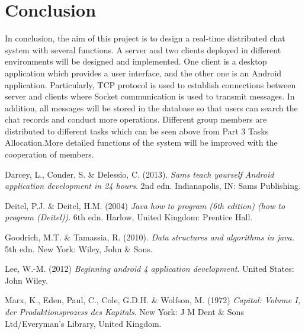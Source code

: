 \documentclass{article}
\begin{document}
\section{Conclusion}

In conclusion, the aim of this project is to design a real-time distributed chat system with several functions. A server and two clients deployed in different environments will be designed and implemented. One client is a desktop application which provides a user interface, and the other one is an Android application. Particularly, TCP protocol is used to establish connections between server and clients where Socket communication is used to transmit messages. In addition, all messages will be stored in the database so that users can search the chat records and conduct more operations. Different group members are distributed to different tasks which can be seen above from Part 3 Tasks Allocation.More detailed functions of the system will be improved with the cooperation of members.




\begin{thebibliography}{9}
Darcey, L., Conder, S. \& Delessio, C. (2013). 
\textit{Sams teach yourself Android application development in 24 hours}. 
2nd edn. Indianapolis, IN: Sams Publishing.
 
Deitel, P.J. \& Deitel, H.M. (2004) 
\textit{Java how to program (6th edition) (how to program (Deitel))}. 
6th edn. Harlow, United Kingdom: Prentice Hall.
 
Goodrich, M.T. \& Tamassia, R. (2010).
\textit{Data structures and algorithms in java.}
 5th edn. New York: Wiley, John \& Sons.
 
Lee, W.-M. (2012) 
\textit{Beginning android 4 application development}. 
 United States: John Wiley.

Marx, K., Eden, Paul, C., Cole, G.D.H. \& Wolfson, M. (1972)
\textit{ Capital: Volume I, der Produktionsprozess des Kapitals}. 
New York: J M Dent \& Sons Ltd/Everyman’s Library, United Kingdom.
\end{thebibliography}
\end{document}
